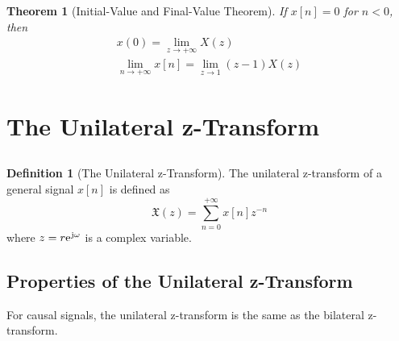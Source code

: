 \documentclass[10pt,UTF8]{article}
\newenvironment{definition box}
{\begin{tcolorbox}[colback=blue!5!white,colframe=blue!75!black,parbox=false,before upper=\par,before lower=\par]}
{\end{tcolorbox}}
\newenvironment{theorem box}
{\begin{tcolorbox}[colback=yellow!5!white,colframe=yellow!75!black,parbox=false,before upper=\par,before lower=\par]}
{\end{tcolorbox}}
\theoremstyle{definition}
\newtheorem{definition inner}{Definition}[section]
\newenvironment{definition}[1][]
{\begin{definition box}\begin{definition inner}[#1]\hfill\par}
{\end{definition inner}\end{definition box}}
\theoremstyle{plain}
\newtheorem{theorem inner}{Theorem}[section]
\newenvironment{theorem}[1][]
{\begin{theorem box}\begin{theorem inner}[#1]\hfill\par}
{\end{theorem inner}\end{theorem box}}
\theoremstyle{definition}
\newtheorem*{proof inner}{\textit{Proof}}
\theoremstyle{remark}
\newcommand{\ju}{\mathrm{j}}  %
\newcommand{\e}{\mathrm{e}{\mkern 1 mu}}
\begin{document}
\begin{theorem}[Initial-Value and Final-Value Theorem]
    If $x[n]=0$ for $n<0$, then
    \begin{gather*}
        x(0) = \lim_{z\to+\infty} X(z) \\
        \lim_{n\to+\infty} x[n] = \lim_{z\to 1} (z-1) X(z)
    \end{gather*}
\end{theorem}



\section{The Unilateral z-Transform}

\subsection{}

\begin{definition}[The Unilateral z-Transform]
The unilateral z-transform of a general signal $x[n]$ is defined as
\begin{equation*}
    \mathfrak{X}(z) =
    \sum_{n=0}^{+\infty} x[n] z^{-n}
\end{equation*}
where $z=r\e^{\ju\omega}$ is a complex variable.
\end{definition}


\subsection{Properties of the Unilateral z-Transform}

For causal signals, the unilateral z-transform is the same as the bilateral z-transform.

\subsubsection{}
\end{document}
